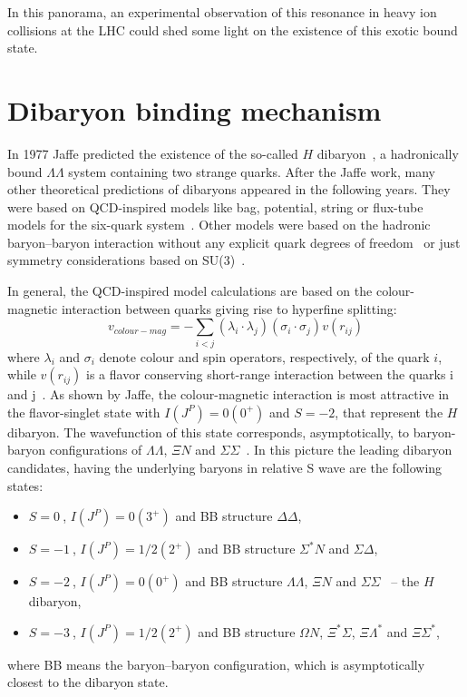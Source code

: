 In this panorama, an experimental observation of this resonance in heavy ion collisions at the LHC
could shed some light on the existence of this exotic bound state.

%
%
\section{Dibaryon binding mechanism} \label{sec:2.1}

In 1977 Jaffe predicted the existence of the so-called $H$ dibaryon~\cite{jaffedib}, a hadronically bound 
$\Lambda \Lambda$ system containing two strange quarks.
After the Jaffe work, many other theoretical predictions of dibaryons appeared in the following years. 
They were based on QCD-inspired models like bag, potential, string or flux-tube models for the
six-quark system~\cite{dsinevitable1,dibpred1,dibpred2,dibpred3,dibpred5,dibpred6,dibpred7,dibpred8,
dibpred9,dibpred10,dibpred11,dibpred12,dibpred13}.
Other models were based on the hadronic baryon–baryon interaction without any explicit quark degrees
of freedom~\cite{dibpred14,dibpred15,dibpred16} or just symmetry considerations based on SU(3)~\cite{dibpred17}.

%

In general, the QCD-inspired model calculations are based on the colour-magnetic interaction between 
quarks giving rise to hyperfine splitting:
\begin{equation} \label{eq:colmag}
    v_{colour-mag} = - \sum_{i<j} (\lambda_{i} \cdot \lambda_{j}) (\sigma_{i} \cdot \sigma_{j})
    v(r_{ij})
\end{equation}
where $\lambda_{i}$ and $\sigma_{i}$ denote colour and spin operators, respectively, of the quark $i$, 
while $v(r_{ij})$ is a flavor conserving short-range interaction between the quarks i and 
j~\cite{colormag}.
As shown by Jaffe, the colour-magnetic interaction is most attractive in the flavor-singlet state with
$I(J^{P}) = 0(0^{+})$ and $S = -2$, that represent the $H$ dibaryon. The wavefunction of this state
corresponds, asymptotically, to baryon-baryon configurations of $\Lambda \Lambda$, $\Xi N$ and 
$\Sigma \Sigma$~\cite{oka}. In this picture the leading dibaryon candidates, having the underlying 
baryons in relative S wave are the following states:
\begin{itemize}
    \item $S=0 \ $, $I(J^{P}) = 0(3^{+})$ and BB structure $\Delta \Delta$,
    \item $S=-1\ $, $I(J^{P}) = 1/2(2^{+})$ and BB structure $\Sigma^{*}N$ and $\Sigma \Delta$,
    \item $S=-2\ $, $I(J^{P}) = 0(0^{+})$ and BB structure $\Lambda \Lambda$, $\Xi N$ and 
$\Sigma \Sigma$ \ -- the $H$ dibaryon,
    \item $S=-3\ $, $I(J^{P}) = 1/2(2^{+})$ and BB structure $\Omega N$, $\Xi^{*} \Sigma$, 
    $\Xi \Lambda^{*}$ and $\Xi \Sigma^{*}$,
\end{itemize}
where BB means the baryon–baryon configuration, which is asymptotically closest to the dibaryon
state.

